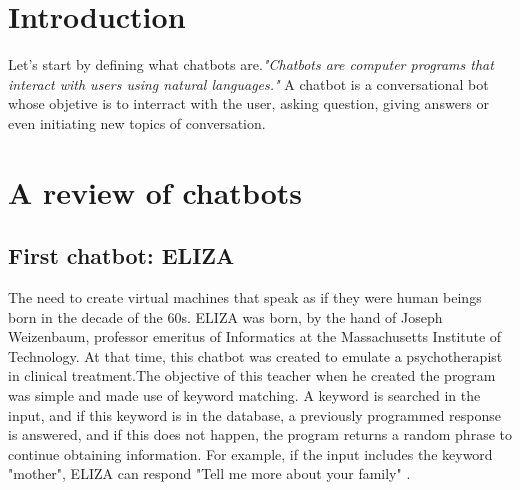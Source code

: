 \documentclass[12pt,twoside]{article}
\theoremstyle{plain}
\theoremstyle{definition}
\theoremstyle{remark}
\begin{document}

\setcounter{tocdepth}{2} 					%
\tableofcontents

\clearpage



\section{Introduction}
\label{sec:introduction}
Let's start by defining what chatbots are.\textit{"Chatbots are computer programs that interact with users using natural languages."} \cite{shawar2007chatbots}
A chatbot is a conversational bot whose objetive is to interract with the user, asking question, giving answers or even initiating new topics of conversation. \cite{huang2007extracting}



\section{A review of chatbots}
\label{sec:basics}

\subsection{First chatbot: ELIZA}
	\label{sec:eliza}
The need to create virtual machines that speak as if they were human beings born in the decade of the 60s. ELIZA was born, by the hand of Joseph Weizenbaum, professor emeritus of Informatics at the Massachusetts Institute of Technology. At that time, this chatbot was created to emulate a psychotherapist in clinical treatment.The objective of this teacher when he created the program was simple and made use of keyword matching. A keyword is searched in the input, and if this keyword is in the database, a previously programmed response is answered, and if this does not happen, the program returns a random phrase to continue obtaining information. For example, if the input includes the keyword "mother", ELIZA can respond "Tell me more about your family" \cite{shawar2007chatbots}.\\
\end{document}
